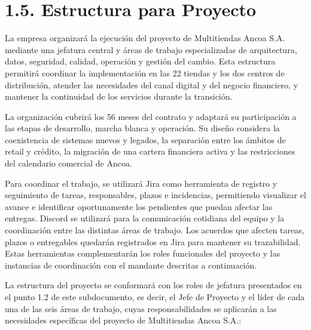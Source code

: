 \documentclass[11pt]{article}
\begin{document}
\section{1.5. Estructura para Proyecto}\label{estructura-para-proyecto}

La empresa organizará la ejecución del proyecto de Multitiendas Ancoa S.A. mediante una jefatura central y áreas de trabajo especializadas de arquitectura, datos, seguridad, calidad, operación y gestión del cambio. Esta estructura permitirá coordinar la implementación en las 22 tiendas y los dos centros de distribución, atender las necesidades del canal digital y del negocio financiero, y mantener la continuidad de los servicios durante la transición.

La organización cubrirá los 56 meses del contrato y adaptará su participación a las etapas de desarrollo, marcha blanca y operación. Su diseño considera la coexistencia de sistemas nuevos y legados, la separación entre los ámbitos de retail y crédito, la migración de una cartera financiera activa y las restricciones del calendario comercial de Ancoa.

Para coordinar el trabajo, se utilizará Jira como herramienta de registro y seguimiento de tareas, responsables, plazos e incidencias, permitiendo visualizar el avance e identificar oportunamente los pendientes que puedan afectar las entregas. Discord se utilizará para la comunicación cotidiana del equipo y la coordinación entre las distintas áreas de trabajo. Los acuerdos que afecten tareas, plazos o entregables quedarán registrados en Jira para mantener su trazabilidad. Estas herramientas complementarán los roles funcionales del proyecto y las instancias de coordinación con el mandante descritas a continuación.

La estructura del proyecto se conformará con los roles de jefatura presentados en el punto 1.2 de este subdocumento, es decir, el Jefe de Proyecto y el líder de cada una de las seis áreas de trabajo, cuyas responsabilidades se aplicarán a las necesidades específicas del proyecto de Multitiendas Ancoa S.A.:
\end{document}
